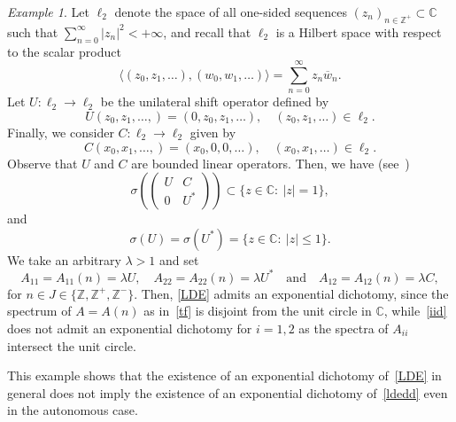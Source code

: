\documentclass[11pt,reqno,a4paper]{amsart}
\theoremstyle{plain}
\numberwithin{equation}{section}
\theoremstyle{remark}
\newtheorem{example}{Example}
\def\Z{\mathbb{Z}}
\begin{document}

\begin{example}
Let $\ell_2$ denote the space of all one-sided sequences $(z_n)_{n\in \Z^+}\subset \mathbb C$ such that $\sum_{n=0}^\infty |z_n|^2<+\infty$, and recall that  $\ell_2$ is a Hilbert space  with respect to the scalar product
\[
\langle (z_0, z_1, \ldots), (w_0, w_1, \ldots)\rangle=\sum_{n=0}^\infty z_n \overline{w}_n.
\]
Let $U\colon \ell_2 \to \ell_2$ be the unilateral shift operator defined by
\[
U(z_0, z_1, \ldots, )=(0, z_0, z_1, \ldots), \quad (z_0, z_1, \ldots)\in \ell_2.
\] Finally, we consider $C\colon \ell_2\to \ell_2$  given by
\[
C(x_0, x_1, \ldots, )=(x_0, 0, 0, \ldots), \quad (x_0, x_1, \ldots)\in \ell_2.
\]
Observe that $U$ and $C$ are bounded linear operators. 
Then, we have (see~\cite[Example 3]{KJ}) \[
\sigma \left (\begin{pmatrix}
U & C\\
0 & U^*
\end{pmatrix}
\right )\subset \{z\in \mathbb C: \ |z|=1\},
\]
and
\[
\sigma(U)=\sigma(U^*)=\{z\in \mathbb C: \ |z| \le 1\}.
\]
We take an arbitrary $\lambda >1$ and set
\[
A_{11}=A_{11}(n)=\lambda U, \quad A_{22}=A_{22}(n)=\lambda U^* \quad \text{and} \quad  A_{12}=A_{12}(n)=\lambda C,
\]
for $n\in J\in \{\Z, \Z^+, \Z^-\}$.
 Then, \eqref{LDE} admits an exponential dichotomy, since the spectrum of $A=A(n)$ as in~\eqref{tf} is disjoint from the unit circle in $\mathbb C$, 
 while~\eqref{iid} does not admit an exponential dichotomy for $i=1, 2$ as the spectra of $A_{ii}$ intersect the unit circle. 

 This example shows that the existence of an exponential dichotomy of~\eqref{LDE} in general does not imply the existence of an exponential dichotomy of~\eqref{ldedd} even in the autonomous case. 
\end{example}
\end{document}
